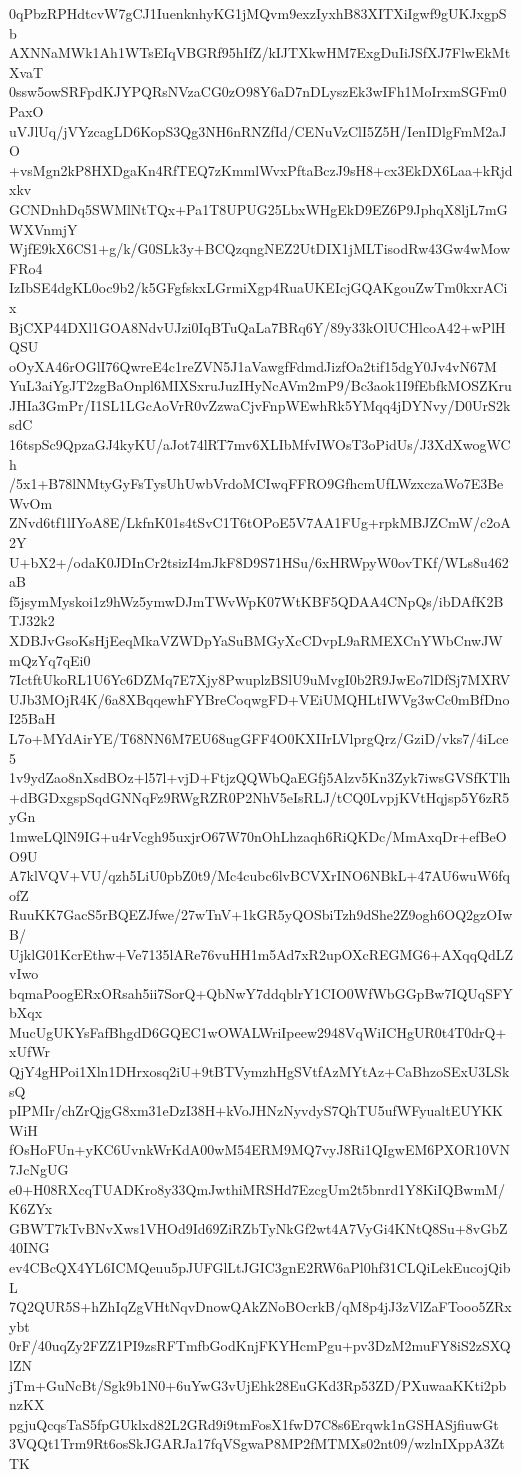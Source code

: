 0qPbzRPHdtcvW7gCJ1IuenknhyKG1jMQvm9exzIyxhB83XITXiIgwf9gUKJxgpSb
AXNNaMWk1Ah1WTsEIqVBGRf95hIfZ/kIJTXkwHM7ExgDuIiJSfXJ7FlwEkMtXvaT
0ssw5owSRFpdKJYPQRsNVzaCG0zO98Y6aD7nDLyszEk3wIFh1MoIrxmSGFm0PaxO
uVJlUq/jVYzcagLD6KopS3Qg3NH6nRNZfId/CENuVzClI5Z5H/IenIDlgFmM2aJO
+vsMgn2kP8HXDgaKn4RfTEQ7zKmmlWvxPftaBczJ9sH8+cx3EkDX6Laa+kRjdxkv
GCNDnhDq5SWMlNtTQx+Pa1T8UPUG25LbxWHgEkD9EZ6P9JphqX8ljL7mGWXVnmjY
WjfE9kX6CS1+g/k/G0SLk3y+BCQzqngNEZ2UtDIX1jMLTisodRw43Gw4wMowFRo4
IzIbSE4dgKL0oc9b2/k5GFgfskxLGrmiXgp4RuaUKEIcjGQAKgouZwTm0kxrACix
BjCXP44DXl1GOA8NdvUJzi0IqBTuQaLa7BRq6Y/89y33kOlUCHlcoA42+wPlHQSU
oOyXA46rOGlI76QwreE4c1reZVN5J1aVawgfFdmdJizfOa2tif15dgY0Jv4vN67M
YuL3aiYgJT2zgBaOnpl6MIXSxruJuzIHyNcAVm2mP9/Bc3aok1I9fEbfkMOSZKru
JHIa3GmPr/I1SL1LGcAoVrR0vZzwaCjvFnpWEwhRk5YMqq4jDYNvy/D0UrS2ksdC
16tspSc9QpzaGJ4kyKU/aJot74lRT7mv6XLIbMfvIWOsT3oPidUs/J3XdXwogWCh
/5x1+B78lNMtyGyFsTysUhUwbVrdoMCIwqFFRO9GfhcmUfLWzxczaWo7E3BeWvOm
ZNvd6tf1lIYoA8E/LkfnK01s4tSvC1T6tOPoE5V7AA1FUg+rpkMBJZCmW/c2oA2Y
U+bX2+/odaK0JDInCr2tsizI4mJkF8D9S71HSu/6xHRWpyW0ovTKf/WLs8u462aB
f5jsymMyskoi1z9hWz5ymwDJmTWvWpK07WtKBF5QDAA4CNpQs/ibDAfK2BTJ32k2
XDBJvGsoKsHjEeqMkaVZWDpYaSuBMGyXcCDvpL9aRMEXCnYWbCnwJWmQzYq7qEi0
7IctftUkoRL1U6Yc6DZMq7E7Xjy8PwuplzBSlU9uMvgI0b2R9JwEo7lDfSj7MXRV
UJb3MOjR4K/6a8XBqqewhFYBreCoqwgFD+VEiUMQHLtIWVg3wCc0mBfDnoI25BaH
L7o+MYdAirYE/T68NN6M7EU68ugGFF4O0KXIIrLVlprgQrz/GziD/vks7/4iLce5
1v9ydZao8nXsdBOz+l57l+vjD+FtjzQQWbQaEGfj5Alzv5Kn3Zyk7iwsGVSfKTlh
+dBGDxgspSqdGNNqFz9RWgRZR0P2NhV5eIsRLJ/tCQ0LvpjKVtHqjsp5Y6zR5yGn
1mweLQlN9IG+u4rVcgh95uxjrO67W70nOhLhzaqh6RiQKDc/MmAxqDr+efBeOO9U
A7klVQV+VU/qzh5LiU0pbZ0t9/Mc4cubc6lvBCVXrINO6NBkL+47AU6wuW6fqofZ
RuuKK7GacS5rBQEZJfwe/27wTnV+1kGR5yQOSbiTzh9dShe2Z9ogh6OQ2gzOIwB/
UjklG01KcrEthw+Ve7135lARe76vuHH1m5Ad7xR2upOXcREGMG6+AXqqQdLZvIwo
bqmaPoogERxORsah5ii7SorQ+QbNwY7ddqblrY1CIO0WfWbGGpBw7IQUqSFYbXqx
MucUgUKYsFafBhgdD6GQEC1wOWALWriIpeew2948VqWiICHgUR0t4T0drQ+xUfWr
QjY4gHPoi1Xln1DHrxosq2iU+9tBTVymzhHgSVtfAzMYtAz+CaBhzoSExU3LSksQ
pIPMIr/chZrQjgG8xm31eDzI38H+kVoJHNzNyvdyS7QhTU5ufWFyualtEUYKKWiH
fOsHoFUn+yKC6UvnkWrKdA00wM54ERM9MQ7vyJ8Ri1QIgwEM6PXOR10VN7JcNgUG
e0+H08RXcqTUADKro8y33QmJwthiMRSHd7EzcgUm2t5bnrd1Y8KiIQBwmM/K6ZYx
GBWT7kTvBNvXws1VHOd9Id69ZiRZbTyNkGf2wt4A7VyGi4KNtQ8Su+8vGbZ40ING
ev4CBcQX4YL6ICMQeuu5pJUFGlLtJGIC3gnE2RW6aPl0hf31CLQiLekEucojQibL
7Q2QUR5S+hZhIqZgVHtNqvDnowQAkZNoBOcrkB/qM8p4jJ3zVlZaFTooo5ZRxybt
0rF/40uqZy2FZZ1PI9zsRFTmfbGodKnjFKYHcmPgu+pv3DzM2muFY8iS2zSXQlZN
jTm+GuNcBt/Sgk9b1N0+6uYwG3vUjEhk28EuGKd3Rp53ZD/PXuwaaKKti2pbnzKX
pgjuQcqsTaS5fpGUklxd82L2GRd9i9tmFosX1fwD7C8s6Erqwk1nGSHASjfiuwGt
3VQQt1Trm9Rt6osSkJGARJa17fqVSgwaP8MP2fMTMXs02nt09/wzlnIXppA3ZtTK
